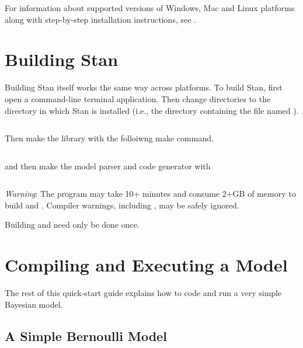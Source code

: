 For information about supported versions of Windows, Mac and Linux
platforms along with step-by-step installation instructions, see
.

\section{Building Stan}

Building Stan itself works the same way across platforms.
To build Stan, first open a command-line terminal application.  Then change
directories to the directory in which Stan is installed (i.e., the
directory containing the file named ).
%
\begin{quote}
\begin{Verbatim}[fontshape=sl]
% cd <stan-home>
\end{Verbatim}
\end{quote}
%
Then make the library with the folloiwng make command.
%
\begin{quote}
\begin{Verbatim}[fontshape=sl]
% make bin/libstan.a
\end{Verbatim}
\end{quote}
%
and then make the model parser and code generator with
%
\begin{quote}
\begin{Verbatim}[fontshape=sl]
% make bin/stanc
\end{Verbatim}
\end{quote}
%
\emph{Warning}: The  program may take 10+ minutes and
consume 2+GB of memory to build  and .
Compiler warnings, including , may be safely ignored.

Building  and  need only be done once.

\section{Compiling and Executing a Model}

The rest of this quick-start guide explains how to code
and run a very simple Bayesian model.

\subsection{A Simple Bernoulli Model}

